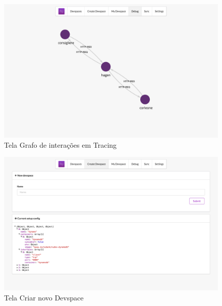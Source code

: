 \begin{figure}[htb]
		\caption{\label{fig_frontend_tracing}Tela Grafo de interações em Tracing}
		\begin{center}
		\includegraphics[width=\textwidth,keepaspectratio]{pictures/frontend/frontend-tracing.png}
		\end{center}
	\end{figure}

\begin{figure}[htb]
		\caption{\label{fig_frontend_create_devspace}Tela Criar novo Devspace}
		\begin{center}
		\includegraphics[width=\textwidth,keepaspectratio]{pictures/frontend/frontend-create-devspace.png}
		\end{center}
	\end{figure}
